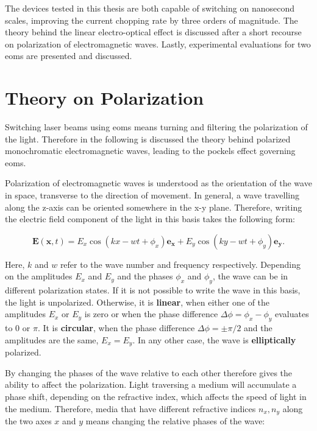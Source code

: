 The devices tested in this thesis are both capable of switching on nanosecond scales, improving the current chopping rate by three orders of magnitude. The theory behind the linear electro-optical effect is discussed after a short recourse on polarization of electromagnetic waves. Lastly, experimental evaluations for two \acp{eom} are presented and discussed.



\section{Theory on Polarization}%
\label{sec:pol}

Switching laser beams using \acp{eom} means turning and filtering the polarization of the light. Therefore in the following is discussed the theory behind polarized monochromatic electromagnetic waves, leading to the pockels effect governing \acp{eom}.

Polarization of electromagnetic waves is understood as the orientation of the wave in space, transverse to the direction of movement. In general, a wave travelling along the z-axis can be oriented somewhere in the x-y plane. Therefore, writing the electric field component of the light in this basis takes the following form:

\begin{equation}
	\mathbf{E}(\mathbf{x}, t) = E_x \cos\left(kx - wt + \phi_x\right) \mathbf{e_x} + E_y \cos\left(ky - wt + \phi_y\right) \mathbf{e_y}.
\end{equation}

Here, $k$ and $w$ refer to the wave number and frequency respectively.
Depending on the amplitudes $E_x$ and $E_y$ and the phases $\phi_x$ and $\phi_y$, the wave can be in different polarization states. If it is not possible to write the wave in this basis, the light is unpolarized. Otherwise, it is \textbf{linear}, when either one of the amplitudes $E_x$ or $E_y$ is zero or when the phase difference $\Delta \phi = \phi_x - \phi_y$ evaluates to 0 or $\pi$. It is \textbf{circular}, when the phase difference $\Delta \phi = \pm \pi/2$ and the amplitudes are the same, $E_x = E_y$. In any other case, the wave is \textbf{elliptically} polarized.

By changing the phases of the wave relative to each other therefore gives the ability to affect the polarization. Light traversing a medium will accumulate a phase shift, depending on the refractive index, which affects the speed of light in the medium. Therefore, media that have different refractive indices $n_x, n_y$ along the two axes $x$ and $y$ means changing the relative phases of the wave:

